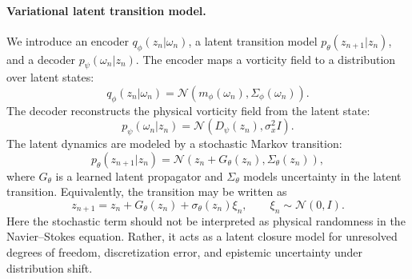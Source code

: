 \documentclass[11pt]{article}
\begin{document}
\paragraph{Variational latent transition model.}
We introduce an encoder $q_\phi(z_n|\omega_n)$, a latent transition model
$p_\theta(z_{n+1}|z_n)$, and a decoder $p_\psi(\omega_n|z_n)$. The encoder maps a vorticity field to a distribution over latent states:
\begin{equation}
    q_\phi(z_n|\omega_n)
    =
    \mathcal N\left(
        m_\phi(\omega_n),
        \Sigma_\phi(\omega_n)
    \right).
\end{equation}
The decoder reconstructs the physical vorticity field from the latent state:
\begin{equation}
    p_\psi(\omega_n|z_n)
    =
    \mathcal N\left(
        D_\psi(z_n),
        \sigma_x^2 I
    \right).
\end{equation}
The latent dynamics are modeled by a stochastic Markov transition:
\begin{equation}
    p_\theta(z_{n+1}|z_n)
    =
    \mathcal N\left(
        z_n + G_\theta(z_n),
        \Sigma_\theta(z_n)
    \right),
\end{equation}
where $G_\theta$ is a learned latent propagator and $\Sigma_\theta$ models uncertainty in the latent transition.
Equivalently, the transition may be written as
\begin{equation}
    z_{n+1}
    =
    z_n + G_\theta(z_n)
    +
    \sigma_\theta(z_n)\xi_n,
    \qquad
    \xi_n\sim\mathcal N(0,I).
\end{equation}
Here the stochastic term should not be interpreted as physical randomness in the Navier--Stokes equation. Rather, it acts as a latent closure model for unresolved degrees of freedom, discretization error, and epistemic uncertainty under distribution shift.
\end{document}
